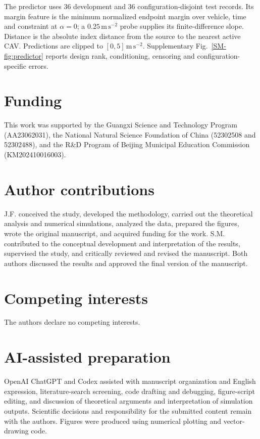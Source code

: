 \documentclass[12pt]{article}
\begin{document}
The predictor uses 36 development and 36 configuration-disjoint test records. Its margin feature is the minimum normalized endpoint margin over vehicle, time and constraint at $\alpha=0$; a $0.25\,\mathrm{m\,s^{-2}}$ probe supplies its finite-difference slope. Distance is the absolute index distance from the source to the nearest active CAV. Predictions are clipped to $[0,5]\,\mathrm{m\,s^{-2}}$. Supplementary Fig.~\ref{SM-fig:predictor} reports design rank, conditioning, censoring and configuration-specific errors.

\section*{Funding}
This work was supported by the Guangxi Science and Technology Program (AA23062031), the National Natural Science Foundation of China (52302508 and 52302488), and the R\&D Program of Beijing Municipal Education Commission (KM202410016003).

\section*{Author contributions}
J.F. conceived the study, developed the methodology, carried out the theoretical analysis and numerical simulations, analyzed the data, prepared the figures, wrote the original manuscript, and acquired funding for the work. S.M. contributed to the conceptual development and interpretation of the results, supervised the study, and critically reviewed and revised the manuscript. Both authors discussed the results and approved the final version of the manuscript.

\section*{Competing interests}
The authors declare no competing interests.

\section*{AI-assisted preparation}
OpenAI ChatGPT and Codex assisted with manuscript organization and English expression, literature-search screening, code drafting and debugging, figure-script editing, and discussion of theoretical arguments and interpretation of simulation outputs. Scientific decisions and responsibility for the submitted content remain with the authors. Figures were produced using numerical plotting and vector-drawing code.
\end{document}
